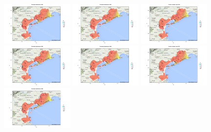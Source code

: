 \documentclass[a4paper,11pt,twoside,openright]{book}							%
\begin{document}
\begin{figure}[H]
\includegraphics[trim=0cm 0cm 4cm 0cm,clip=true,width=0.32\textwidth]{Immagini/venezia_senza_covariate/Maps2002.png}
\includegraphics[trim=0cm 0cm 4cm 0cm,clip=true,width=0.32\textwidth]{Immagini/venezia_senza_covariate/Maps2003.png}
\includegraphics[trim=0cm 0cm 4cm 0cm,clip=true,width=0.32\textwidth]{Immagini/venezia_senza_covariate/Maps2004.png}
\includegraphics[trim=0cm 0cm 4cm 0cm,clip=true,width=0.32\textwidth]{Immagini/venezia_senza_covariate/Maps2005.png}
\includegraphics[trim=0cm 0cm 4cm 0cm,clip=true,width=0.32\textwidth]{Immagini/venezia_senza_covariate/Maps2006.png}
\includegraphics[trim=0cm 0cm 4cm 0cm,clip=true,width=0.32\textwidth]{Immagini/venezia_senza_covariate/Maps2007.png}
\includegraphics[trim=0cm 0cm 4cm 0cm,clip=true,width=0.32\textwidth]{Immagini/venezia_senza_covariate/Maps2008.png}

\end{figure}
\end{document}
